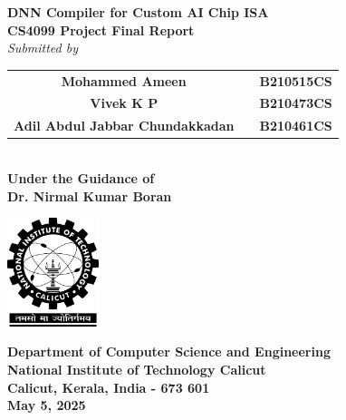\documentclass[12pt]{report}
\begin{document}
\begin{titlepage}
    \begin{center}
        \vspace{1cm}
        \huge
        \textbf{DNN Compiler for Custom AI Chip ISA}\\

        \normalsize
        \textbf{CS4099 Project Final Report}\\
        \vspace{1cm}
        \emph{Submitted by}\\
        \vspace{0.5cm}
        \begin{tabular}{ccc}
            \textbf{Mohammed Ameen }                &  & \textbf{B210515CS} \\
            \textbf{Vivek K P}                      &  & \textbf{B210473CS} \\
            \textbf{Adil Abdul Jabbar Chundakkadan} &  & \textbf{B210461CS} \\
        \end{tabular}\\
        \vspace{0.8cm}
        \textbf{Under the Guidance of\\Dr. Nirmal Kumar Boran}\\
        \vspace{0.8cm}
        \begin{center}
            \includegraphics[width=0.2\textwidth]{nitc-logo.png}
        \end{center}
        \vspace{0.8cm}
        \textbf{Department of Computer Science and Engineering}\\
        \textbf{National Institute of Technology Calicut}\\
        \textbf{Calicut, Kerala, India - 673 601}\\
        \vspace{0.8cm}
        \textbf{May 5, 2025}
    \end{center}
\end{titlepage}
\end{document}
